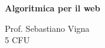 \documentclass[\main/main.tex]{subfiles}
\begin{document}
\begin{titlepage}
    \begin{center}
        \vspace*{1em}
        
        \textbf{\large{Algoritmica per il web}}
        
        \vspace{1em}
        Prof. Sebastiano Vigna
        \\
        \small{5 CFU}
        \vspace{1em}
        
		 
        
    \end{center}
\end{titlepage}
\end{document}
